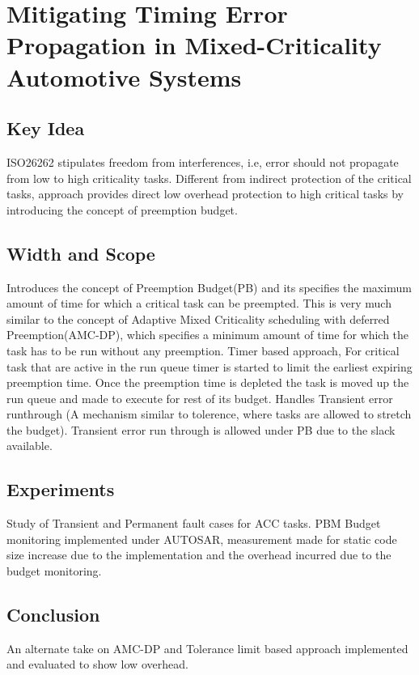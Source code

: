 \section{Mitigating Timing Error Propagation in	Mixed-Criticality Automotive Systems}
\subsection{Key Idea}
ISO26262 stipulates freedom from interferences, i.e, error should not propagate from low to high criticality tasks.
Different from indirect protection of the critical tasks, approach provides direct low overhead protection to high critical tasks by introducing the concept of preemption budget.
\subsection{Width and Scope}
Introduces the concept of Preemption Budget(PB) and its specifies the maximum amount of time for which a critical task can be preempted. This is very much similar to the concept of Adaptive Mixed Criticality scheduling with deferred Preemption(AMC-DP), which specifies a minimum amount of time for which the task has to be run without any preemption.
Timer based approach, For critical task that are active in the run queue timer is started to limit the earliest expiring preemption time. Once the preemption time is depleted the task is moved up the run queue and made to execute for rest of its budget.
Handles Transient error runthrough (A mechanism similar to tolerence, where tasks are allowed to stretch the budget). Transient error run through is allowed under PB due to the slack available.
\subsection{Experiments}
Study of Transient and Permanent fault cases for ACC tasks.
PBM Budget monitoring implemented under AUTOSAR, measurement made for static code size increase due to the implementation and the overhead incurred due to the budget monitoring.
\subsection{Conclusion}
An alternate take on AMC-DP and Tolerance limit based approach implemented and evaluated to show low overhead.